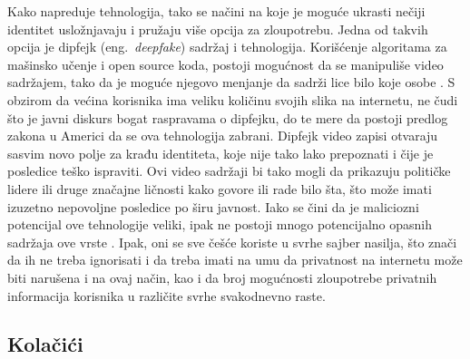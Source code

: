 \documentclass[a4paper]{article}
\begin{document}
\par Kako napreduje tehnologija, tako se načini na koje je moguće ukrasti nečiji identitet usložnjavaju i pružaju više opcija za zloupotrebu. Jedna od takvih opcija je dipfejk (eng.~{\em deepfake}) sadržaj i tehnologija. Korišćenje algoritama za mašinsko učenje i open source koda, postoji mogućnost da se manipuliše video sadržajem, tako da je moguće njegovo menjanje da sadrži lice bilo koje osobe \cite{it3}.  S obzirom da većina korisnika ima veliku količinu svojih slika na internetu, ne čudi što je javni diskurs bogat raspravama o dipfejku, do te mere da postoji predlog zakona u Americi da se ova tehnologija zabrani. Dipfejk video zapisi otvaraju sasvim novo polje za krađu identiteta, koje nije tako lako prepoznati i čije je posledice teško ispraviti. Ovi video sadržaji bi tako mogli da prikazuju političke lidere ili druge značajne ličnosti kako govore ili rade bilo šta, što može imati izuzetno nepovoljne posledice po širu javnost. Iako se čini da je maliciozni potencijal ove tehnologije veliki, ipak ne postoji mnogo potencijalno opasnih sadržaja ove vrste \cite{it4}. Ipak, oni se sve češće koriste u svrhe sajber nasilja, što znači da ih ne treba ignorisati i da treba imati na umu da privatnost na internetu može biti narušena i na ovaj način, kao i da broj mogućnosti zloupotrebe privatnih informacija korisnika u različite svrhe svakodnevno raste.  

\subsection{Kolačići}
\end{document}
